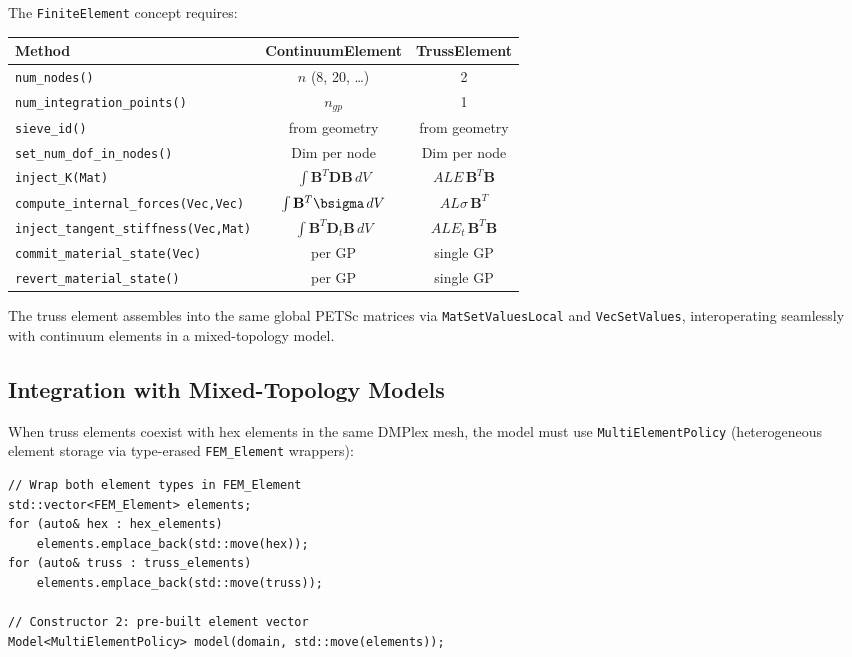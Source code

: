 The \texttt{FiniteElement} concept requires:
\begin{center}
\begin{tabular}{lcc}
    \toprule
    Method & ContinuumElement & TrussElement \\
    \midrule
    \texttt{num\_nodes()} & $n$ (8, 20, \ldots) & 2 \\
    \texttt{num\_integration\_points()} & $n_{gp}$ & 1 \\
    \texttt{sieve\_id()} & from geometry & from geometry \\
    \texttt{set\_num\_dof\_in\_nodes()} & $\mathrm{Dim}$ per node & $\mathrm{Dim}$ per node \\
    \texttt{inject\_K(Mat)} & $\int \mathbf{B}^T\mathbf{D}\mathbf{B}\,dV$
                             & $A L E\,\mathbf{B}^T\mathbf{B}$ \\
    \texttt{compute\_internal\_forces(Vec,Vec)} & $\int \mathbf{B}^T\bsigma\,dV$
                                                 & $A L \sigma\,\mathbf{B}^T$ \\
    \texttt{inject\_tangent\_stiffness(Vec,Mat)} & $\int \mathbf{B}^T\mathbf{D}_t\mathbf{B}\,dV$
                                                  & $A L E_t\,\mathbf{B}^T\mathbf{B}$ \\
    \texttt{commit\_material\_state(Vec)} & per GP & single GP \\
    \texttt{revert\_material\_state()} & per GP & single GP \\
    \bottomrule
\end{tabular}
\end{center}

The truss element assembles into the same global PETSc matrices via
\texttt{MatSetValuesLocal} and \texttt{VecSetValues}, interoperating
seamlessly with continuum elements in a mixed-topology model.


\subsection{Integration with Mixed-Topology Models}
\label{sec:truss-mixed}

When truss elements coexist with hex elements in the same DMPlex mesh,
the model must use \texttt{MultiElementPolicy} (heterogeneous element
storage via type-erased \texttt{FEM\_Element} wrappers):

\begin{lstlisting}[style=cppstyle]
// Wrap both element types in FEM_Element
std::vector<FEM_Element> elements;
for (auto& hex : hex_elements)
    elements.emplace_back(std::move(hex));
for (auto& truss : truss_elements)
    elements.emplace_back(std::move(truss));

// Constructor 2: pre-built element vector
Model<MultiElementPolicy> model(domain, std::move(elements));
\end{lstlisting}

